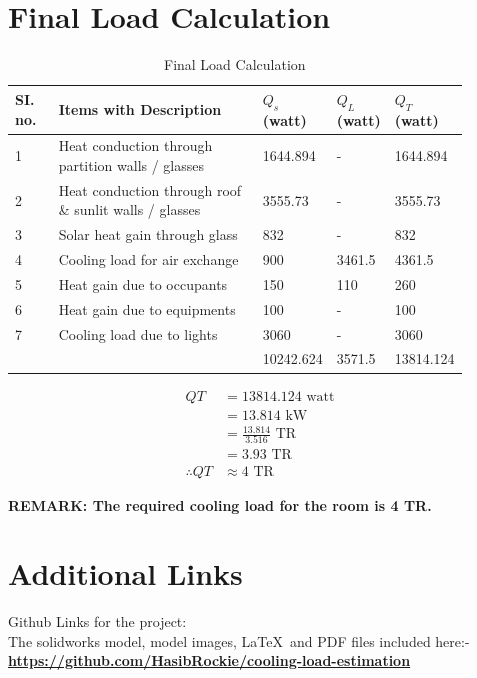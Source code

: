 \documentclass{article}
\begin{document}
    \section{Final Load Calculation}
    \begin{table}[ht]
      \centering
      \begin{adjustbox}{width=\textwidth}
      \begin{tabularx}{\linewidth}{p{0.10\linewidth} p{0.5\linewidth} p{0.10\linewidth} p{0.10\linewidth} p{0.10\linewidth}}
          \hline
          \textbf{SI. no.} & \textbf{Items with Description} & \textbf{$Q_s$ (watt)} & \textbf{$Q_L$ (watt)} & \textbf{$Q_T$ (watt)} \\
          \hline
          1 & Heat conduction through partition walls / glasses & 1644.894 & - & 1644.894 \\
          2 & Heat conduction through roof \& sunlit walls / glasses & 3555.73 & - & 3555.73 \\
          3 & Solar heat gain through glass  & 832 & - & 832 \\
          4 & Cooling load for air exchange & 900 & 3461.5 & 4361.5 \\
          5 & Heat gain due to occupants & 150 & 110 & 260 \\
          6 & Heat gain due to equipments & 100 & - & 100 \\
          7 & Cooling load due to lights & 3060 & - & 3060 \\
          \hline
          && 10242.624 & 3571.5 & 13814.124 \\
      \end{tabularx}
      \end{adjustbox}
      \caption{Final Load Calculation}
      \label{tab:Final Calculation}
      \end{table}

      \begin{align*}
        QT &= 13814.124 \text{ watt} \\
        &= 13.814 \text{ kW} \\
        &= \frac{13.814}{3.516} \text{ TR} \\
        &= 3.93 \text{ TR} \\
        \therefore QT &\approx 4 \text{ TR}
      \end{align*}

      \textbf{REMARK: The required cooling load for the room is 4 TR.}

      \section{Additional Links}
      Github Links for the project: \\
      The solidworks model, model images, \LaTeX\,  and PDF files included here:- \\ 
      
      \textbf{\href{https://github.com/HasibRockie/cooling-load-estimation}{https://github.com/HasibRockie/cooling-load-estimation}}
\end{document}
